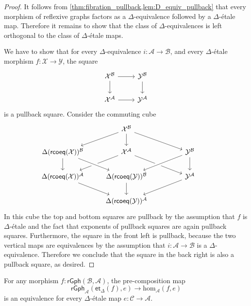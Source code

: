 \begin{proof}
It follows from \cref{thm:fibration_pullback,lem:D_equiv_pullback} that every morphism of reflexive graphs factors as a $\Delta$-equivalence followed by a $\Delta$-\'etale map. Therefore it remains to show that the class of $\Delta$-equivalences is left orthogonal to the class of $\Delta$-\'etale maps.

We have to show that for every $\Delta$-equivalence $i:\mathcal{A}\to\mathcal{B}$, and every $\Delta$-\'etale morphism $f:\mathcal{X}\to\mathcal{Y}$, the square
\begin{equation*}
\begin{tikzcd}
\mathcal{X}^{\mathcal{B}} \arrow[r] \arrow[d] & \mathcal{Y}^{\mathcal{B}} \arrow[d] \\
\mathcal{X}^{\mathcal{A}} \arrow[r] & \mathcal{Y}^{\mathcal{A}}
\end{tikzcd}
\end{equation*}
is a pullback square. Consider the commuting cube
\begin{equation*}
\begin{tikzcd}
& \mathcal{X}^{\mathcal{B}} \arrow[dl] \arrow[d] \arrow[dr] \\
\Delta(\rcoeq(\mathcal{X}))^{\mathcal{B}} \arrow[d] & \mathcal{X}^{\mathcal{A}} \arrow[dl] \arrow[dr] & \mathcal{Y}^{\mathcal{B}} \arrow[d] \arrow[dl,crossing over] \\
\Delta(\rcoeq(\mathcal{X}))^{\mathcal{A}} \arrow[dr] & \Delta(\rcoeq(\mathcal{Y}))^{\mathcal{B}} \arrow[from=ul,crossing over] \arrow[d] & \mathcal{Y}^{\mathcal{A}} \arrow[dl] \\
& \Delta(\rcoeq(\mathcal{Y}))^{\mathcal{A}} & \phantom{\Delta(\rcoeq(\mathcal{X}))^{\mathcal{B}}}
\end{tikzcd}
\end{equation*}
In this cube the top and bottom squares are pullback by the assumption that $f$ is $\Delta$-\'etale and the fact that exponents of pullback squares are again pullback squares. Furthermore, the square in the front left is pullback, because the two vertical maps are equivalences by the assumption that $i:\mathcal{A}\to\mathcal{B}$ is a $\Delta$-equivalence. Therefore we conclude that the square in the back right is also a pullback square, as desired.
\end{proof}

\begin{thm}
For any morphism $f:\mathsf{rGph}(\mathcal{B},\mathcal{A})$, the pre-composition map
\begin{equation*}
\mathsf{rGph}_{\mathcal{A}}(\mathsf{et}_\Delta(f),e)\to \mathrm{hom}_{\mathcal{A}}(f,e)
\end{equation*}
is an equivalence for every $\Delta$-\'etale map $e:\mathcal{C}\to\mathcal{A}$.
\end{thm}

